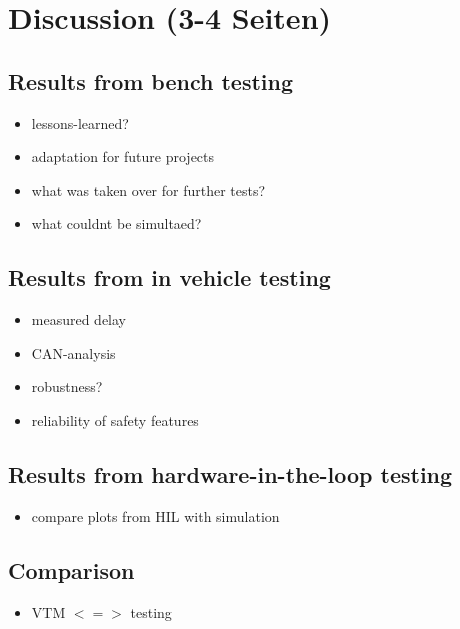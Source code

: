 \documentclass[ExampleMasters.tex]{subfiles}
\begin{document}
\clearpage
\chapter{Discussion (3-4 Seiten)}
\label{chap:discussion}

\section{Results from bench testing}
\label{sec:results_bench}

\begin{itemize}
	\item lessons-learned?
	\item adaptation for future projects
	\item what was taken over for further tests? 
	\item what couldnt be simultaed?
\end{itemize}

\section{Results from in vehicle testing}
\label{sec:results_vehicle_testing}

\begin{itemize}
	\item measured delay
	\item CAN-analysis
	\item robustness?
	\item reliability of safety features
\end{itemize}
\section{Results from hardware-in-the-loop testing}
\begin{itemize}
	\item compare plots from HIL with simulation
\end{itemize}

\section{Comparison}
\label{sec:results_comparrison}
\begin{itemize}
	\item VTM $<=>$ testing
\end{itemize}
\end{document}
